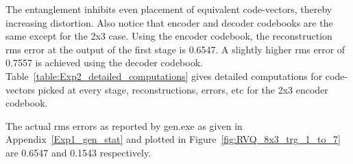 The entanglement inhibits even placement of equivalent code-vectors, thereby increasing distortion.
Also notice that encoder and decoder codebooks are the same except for the 2x3 case.  Using the encoder codebook, the reconstruction rms error at the output of the first stage is 0.6547.  A slightly higher rms error of 0.7557 is achieved using the decoder codebook.   Table~\ref{table:Exp2_detailed_computations} gives detailed computations for code-vectors picked at every stage, reconstructions, errors, etc for the 2x3 encoder codebook.  

The actual rms errors as reported by gen.exe as given in Appendix~\ref{Exp1_gen_stat} and plotted in Figure~\ref{fig:RVQ_8x3_trg_1_to_7} are 0.6547 and 0.1543 respectively.


\begin{table}
\centering
{}\hspace{0.2in}
\hspace{0.2in}
\hspace{0.2in}
\hspace{0.2in}
\hspace{0.2in}

\end{table}
